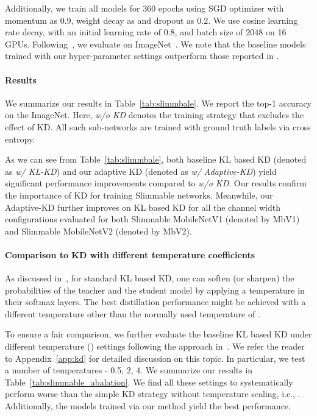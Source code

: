 \documentclass{article}
\begin{document}
Additionally, we train all models for 360 epochs using SGD optimizer with momentum as 0.9, weight decay as  and dropout as 0.2. 
We use cosine learning rate decay, with an initial learning rate of 0.8, and batch size of 2048 on 16 GPUs.  
Following~\citet{yu2019universally}, we evaluate on ImageNet~\citep{deng2009imagenet}. 
We note that the baseline models trained with our hyper-parameter settings 
outperform those reported in \citet{yu2019universally}. 


\paragraph{Results} 
We summarize our results in Table~\ref{tab:slimmbale}. 
We report the top-1 accuracy on the ImageNet.
Here, \emph{w/o KD} denotes the training strategy that excludes the effect of KD.  All such sub-networks are trained with ground truth labels via cross entropy. 

As we can see from Table~\ref{tab:slimmbale}, 
both baseline KL based KD (denoted as \emph{w/ KL-KD}) and our adaptive KD (denoted as \emph{w/ Adaptive-KD}) yield significant performance improvements compared to \emph{w/o KD}. 
Our results confirm the importance of KD for training Slimmable networks. 
Meanwhile, our Adaptive-KD further improves on KL based KD for all the channel width configurations evaluated for both Slimmable MobileNetV1 (denoted by MbV1) and Slimmable MobileNetV2 (denoted by MbV2). 

\paragraph{Comparison to KD with different temperature coefficients}
As discussed in~\citet{hinton2015distilling}, 
for standard KL based KD, one can soften (or sharpen) the probabilities of the teacher and the student model by applying a temperature in their softmax layers. The best distillation performance might be achieved with a different temperature other than the normally used temperature of . 

To ensure a fair comparison,  
we further evaluate the baseline KL based KD under different temperature () settings following the approach in~\citet{hinton2015distilling}. We refer the reader to  Appendix~\ref{app:kd} for detailed discussion on this topic.
In particular, we test a number of temperatures - 0.5, 2, 4. 
We summarize our results in Table~\ref{tab:slimmable_abalation}.
We find all these settings to systematically perform worse 
than the simple KD strategy without temperature scaling, i.e., . 
Additionally, the models trained via our method yield the best performance. 
\end{document}
